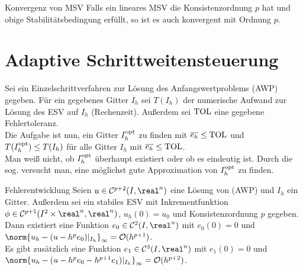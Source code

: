 \begin{Satz}{Konvergenz von MSV}
    Falls ein lineares MSV die Konsistenzordnung $p$ hat und
    obige Stabilitätsbedingung erfüllt, so ist es auch konvergent mit Ordnung
    $p$.
\end{Satz}

\pagebreak

\section{%
    Adaptive Schrittweitensteuerung%
}

\begin{Bem}
    Sei ein Einzelschrittverfahren zur Lösung des Anfangswertproblems (AWP)
    gegeben.
    Für ein gegebenes Gitter $I_h$ sei $T(I_h)$ der numerische Aufwand zur
    Lösung des ESV auf $I_h$ (Rechenzeit).
    Außerdem sei $\text{TOL}$ eine gegebene Fehlertoleranz.\\
    Die Aufgabe ist nun, ein Gitter $I_h^{\text{opt}}$ zu finden mit
    $\overline{e_h} \le \text{TOL}$ und
    $T(I_h^{\text{opt}}) \le T(I_h)$ für alle Gitter $I_h$ mit
    $\overline{e_h} \le \text{TOL}$.\\
    Man weiß nicht, ob $I_h^{\text{opt}}$ überhaupt existiert oder ob es eindeutig ist.
    Durch die sog.  versucht man,
    eine möglichst gute Approximation von $I_h^{\text{opt}}$ zu finden.
\end{Bem}

\begin{Satz}{Fehlerentwicklung}
    Seien $u \in \C^{p+2}(I, \real^n)$ eine Lösung von (AWP) und
    $I_h$ ein Gitter.
    Außerdem sei ein stabiles ESV mit Inkrementfunktion
    $\phi \in \C^{p+1}(I^2 \times \real^n, \real^n)$, $u_h(0) = u_0$
    und Konsistenzordnung $p$ gegeben.\\
    Dann existiert eine Funktion $e_0 \in \C^2(I, \real^n)$ mit
    $e_0(0) = 0$ und\\
    $\norm{u_h - (u - h^p e_0)|_{I_h}}_\infty = \O(h^{p+1})$.\\
    Es gibt zusätzlich eine Funktion
    $e_1 \in \C^3(I, \real^n)$ mit $e_1(0) = 0$ und\\
    $\norm{u_h - (u - h^p e_0 - h^{p+1} e_1)|_{I_h}}_\infty = \O(h^{p+2})$.
\end{Satz}

\linie

